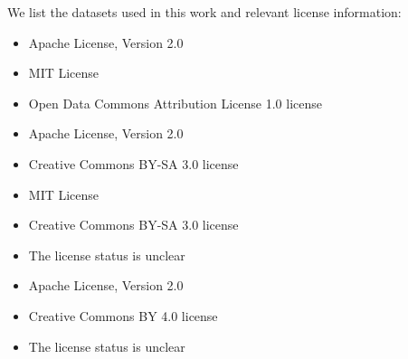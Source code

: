 \documentclass[10pt]{article}
\theoremstyle{definition}
\theoremstyle{plain}
\begin{document}
\newpage 
We list the datasets used in this work and relevant license information:
\begin{itemize}
\item {}   Apache License, Version 2.0
\item {}    MIT License
\item {}  Open Data Commons Attribution License 1.0 license
\item {}  Apache License, Version 2.0
\item {}       Creative Commons BY-SA 3.0 license   
\item {}       MIT License
\item {}           Creative Commons BY-SA 3.0 license
\item {}       The license status is unclear  
\item {}          Apache License, Version 2.0
\item {}        Creative Commons BY 4.0 license
\item {}     The license status is unclear
\end{itemize}
\end{document}
